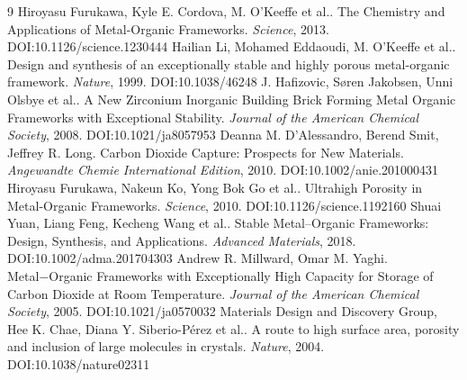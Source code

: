\documentclass[11pt]{article}
\begin{document}
\begin{thebibliography}{9}
 Hiroyasu Furukawa, Kyle E. Cordova, M. O’Keeffe et al.. The Chemistry and Applications of Metal-Organic Frameworks. \emph{Science}, 2013. DOI:10.1126/science.1230444
 Hailian Li, Mohamed Eddaoudi, M. O’Keeffe et al.. Design and synthesis of an exceptionally stable and highly porous metal-organic framework. \emph{Nature}, 1999. DOI:10.1038/46248
 J. Hafizovic, Søren Jakobsen, Unni Olsbye et al.. A New Zirconium Inorganic Building Brick Forming Metal Organic Frameworks with Exceptional Stability. \emph{Journal of the American Chemical Society}, 2008. DOI:10.1021/ja8057953
 Deanna M. D’Alessandro, Berend Smit, Jeffrey R. Long. Carbon Dioxide Capture: Prospects for New Materials. \emph{Angewandte Chemie International Edition}, 2010. DOI:10.1002/anie.201000431
 Hiroyasu Furukawa, Nakeun Ko, Yong Bok Go et al.. Ultrahigh Porosity in Metal-Organic Frameworks. \emph{Science}, 2010. DOI:10.1126/science.1192160
 Shuai Yuan, Liang Feng, Kecheng Wang et al.. Stable Metal–Organic Frameworks: Design, Synthesis, and Applications. \emph{Advanced Materials}, 2018. DOI:10.1002/adma.201704303
 Andrew R. Millward, Omar M. Yaghi. Metal−Organic Frameworks with Exceptionally High Capacity for Storage of Carbon Dioxide at Room Temperature. \emph{Journal of the American Chemical Society}, 2005. DOI:10.1021/ja0570032
 Materials Design and Discovery Group, Hee K. Chae, Diana Y. Siberio-Pérez et al.. A route to high surface area, porosity and inclusion of large molecules in crystals. \emph{Nature}, 2004. DOI:10.1038/nature02311
\end{thebibliography}
\end{document}
